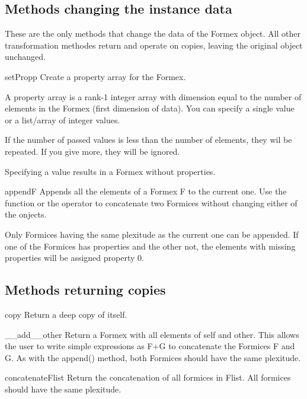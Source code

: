 \subsection{Methods changing the instance data}
These are the only methods that change the data of the Formex object. All other transformation methodes return and operate on copies, leaving the original object unchanged.

\begin{methoddesc}{setProp}{p}
Create a property array for the Formex.

A property array is a rank-1 integer array with dimension equal to the number of elements in the Formex (first dimension of data). You can specify a single value or a list/array of integer values.

If the number of passed values is less than the number of elements, they wil be repeated. If you give more, they will be ignored. 

Specifying a value  results in a Formex without properties.
\end{methoddesc}

\begin{methoddesc}{append}{F}
Appends all the elements of a Formex F to the current one. Use the  function or the \Code{+} operator to concatenate two Formices without changing either of the onjects.

Only Formices having the same plexitude as the current one can be appended.
If one of the Formices has properties and the other not, the elements with missing properties will be assigned property 0.
\end{methoddesc}


\subsection{Methods returning copies}

\begin{methoddesc}{copy}{}
Return a deep copy of itself.
\end{methoddesc}


\begin{methoddesc}{__add__}{other}
Return a Formex with all elements of self and other. This allows the user to write simple expressions as F+G to concatenate the Formices F and G. As with the append() method, both Formices should have the same plexitude.
\end{methoddesc}


\begin{methoddesc}{concatenate}{Flist}
Return the concatenation of all formices in Flist. All formices should have the same plexitude. \classmethod 
\end{methoddesc}


